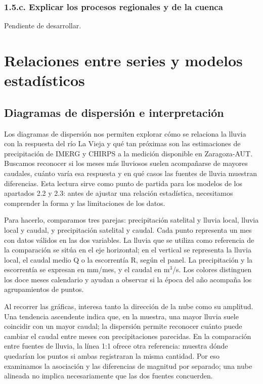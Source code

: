 \documentclass[10pt,a4paper]{article}
\begin{document}
\subsubsection*{1.5.c. Explicar los procesos regionales y de la cuenca}
Pendiente de desarrollar.
\clearpage
\section{Relaciones entre series y modelos estadísticos}
\setcounter{equation}{0}

\subsection{Diagramas de dispersión e interpretación}
Los diagramas de dispersión nos permiten explorar cómo se relaciona la lluvia con la respuesta del río La Vieja y qué tan próximas son las estimaciones de precipitación de IMERG y CHIRPS a la medición disponible en Zaragoza-AUT. Buscamos reconocer si los meses más lluviosos suelen acompañarse de mayores caudales, cuánto varía esa respuesta y en qué casos las fuentes de lluvia muestran diferencias. Esta lectura sirve como punto de partida para los modelos de los apartados 2.2 y 2.3: antes de ajustar una relación estadística, necesitamos comprender la forma y las limitaciones de los datos.

Para hacerlo, comparamos tres parejas: precipitación satelital y lluvia local, lluvia local y caudal, y precipitación satelital y caudal. Cada punto representa un mes con datos válidos en las dos variables. La lluvia que se utiliza como referencia de la comparación se sitúa en el eje horizontal; en el vertical se representa la lluvia local, el caudal medio Q o la escorrentía R, según el panel. La precipitación y la escorrentía se expresan en mm/mes, y el caudal en m$^3$/s. Los colores distinguen los doce meses calendario y ayudan a observar si la época del año acompaña los agrupamientos de puntos.

Al recorrer las gráficas, interesa tanto la dirección de la nube como su amplitud. Una tendencia ascendente indica que, en la muestra, una mayor lluvia suele coincidir con un mayor caudal; la dispersión permite reconocer cuánto puede cambiar el caudal entre meses con precipitaciones parecidas. En la comparación entre fuentes de lluvia, la línea 1:1 ofrece otra referencia: muestra dónde quedarían los puntos si ambas registraran la misma cantidad. Por eso examinamos la asociación y las diferencias de magnitud por separado; una nube alineada no implica necesariamente que las dos fuentes concuerden.
\end{document}
